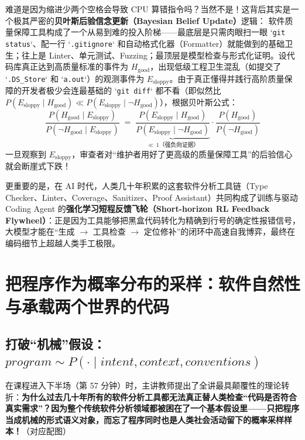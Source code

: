 \documentclass[a4paper]{article}
\begin{document}
难道是因为缩进少两个空格会导致 CPU 算错指令吗？当然不是！这背后其实是一个极其严密的\textbf{贝叶斯后验信念更新（Bayesian Belief Update）}逻辑：
软件质量保障工具构成了一个从易到难的投入阶梯——最底层是只需肉眼扫一眼 `\texttt{git status}`、配一行 `\texttt{.gitignore}` 和自动格式化器（Formatter）就能做到的基础卫生；往上是 Linter、单元测试、Fuzzing；最顶层是模型检查与形式化证明。设代码库真正达到高质量标准的事件为 $H_{\text{good}}$，出现低级工程卫生混乱（如提交了 `\texttt{.DS\_Store}` 和 `\texttt{a.out}`）的观测事件为 $E_{\text{sloppy}}$。由于真正懂得并践行高阶质量保障的开发者极少会连最基础的 `\texttt{git diff}` 都不看（即似然比 $P(E_{\text{sloppy}} \mid H_{\text{good}}) \ll P(E_{\text{sloppy}} \mid \neg H_{\text{good}})$），根据贝叶斯公式：
\begin{equation}
\frac{P(H_{\text{good}} \mid E_{\text{sloppy}})}{P(\neg H_{\text{good}} \mid E_{\text{sloppy}})}
\;=\;
\underbrace{\frac{P(E_{\text{sloppy}} \mid H_{\text{good}})}{P(E_{\text{sloppy}} \mid \neg H_{\text{good}})}}_{\ll\, 1\text{（强负向证据）}}
\cdot
\frac{P(H_{\text{good}})}{P(\neg H_{\text{good}})}
\label{eq:bayesian_code_hygiene}
\end{equation}
一旦观察到 $E_{\text{sloppy}}$，审查者对“维护者用好了更高级的质量保障工具”的后验信心就会断崖式下跌！

更重要的是，在 AI 时代，人类几十年积累的这套软件分析工具链（Type Checker、Linter、Coverage、Sanitizer、Proof Assistant）共同构成了训练与驱动 Coding Agent 的\textbf{强化学习短程反馈飞轮（Short-horizon RL Feedback Flywheel）}：正是因为工具能够把黑盒代码转化为精确到行号的确定性报错信号，大模型才能在“生成 $\to$ 工具检查 $\to$ 定位修补”的闭环中高速自我博弈，最终在编码细节上超越人类手工极限。

\section{把程序作为概率分布的采样：软件自然性与承载两个世界的代码}

\subsection{打破“机械”假设：$\mathit{program} \sim P(\cdot \mid \mathit{intent}, \mathit{context}, \mathit{conventions})$}

在课程进入下半场（第 57 分钟）时，主讲教师提出了全讲最具颠覆性的理论转折：\textbf{为什么过去几十年所有的软件分析工具都无法真正替人类检查“代码是否符合真实需求”？因为整个传统软件分析领域都被困在了一个基本假设里——只把程序当成机械的形式语义对象，而忘了程序同时也是人类社会活动留下的概率采样样本！}（对应配图）
\end{document}
